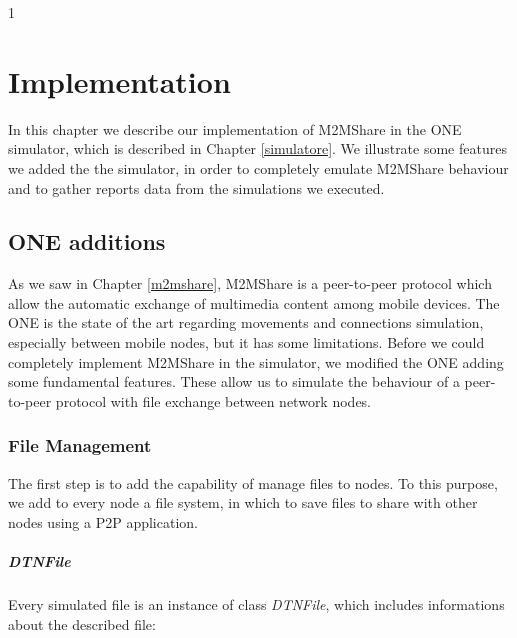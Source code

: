 
1\chapter{Implementation}\label{implementazione} %



\graphicspath{{6-implementazione/img/}}


In this chapter we describe our implementation of M2MShare in the ONE simulator, which is described in Chapter \ref{simulatore}. We illustrate some features we added the the simulator, in order to completely emulate M2MShare behaviour and to gather reports data from the simulations we executed.
  

\section{ONE additions}
As we saw in Chapter \ref{m2mshare}, M2MShare is a peer-to-peer protocol which allow the automatic exchange of multimedia content among mobile devices. The ONE is the state of the art regarding movements and connections simulation, especially between mobile nodes, but it has some limitations. Before we could completely implement M2MShare in the simulator, we modified the ONE adding some fundamental features. These allow us to simulate the behaviour of a peer-to-peer protocol with file exchange between network nodes.


\subsection{File Management}
The first step is to add the capability of manage files to nodes. To this purpose, we add to every node a file system, in which to save files to share with other nodes using a P2P application. 


\paragraph{DTNFile}
Every simulated file is an instance of class \textit{DTNFile}, which includes informations about the described file:

